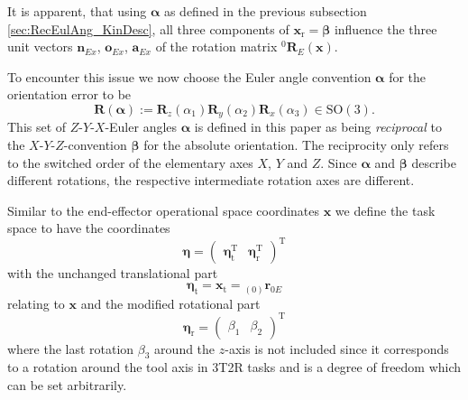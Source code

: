 \documentclass[twocolumn,10pt]{IFTOMM}
\newcommand{\bm}[1]{\boldsymbol{#1}}
\newcommand{\ortvek}[4]{{ }_{(#1)}{\boldsymbol{#2}}^{#3}_{#4} }
\newcommand{\rotmat}[2]{{{ }^{#1}\boldsymbol{R}}_{#2}}
\newcommand{\transp}[0]{{\mathrm{T}}}
\begin{document}
It is apparent, that using $\bm{\alpha}$ as defined in the previous subsection\,\ref{sec:RecEulAng_KinDesc}, all three components of $\bm{x}_{\mathrm{r}}=\bm{\beta}$ influence the three unit vectors $\bm{n}_{Ex}$, $\bm{o}_{Ex}$, $\bm{a}_{Ex}$ of the rotation matrix $\rotmat{0}{E}(\bm{x})$.

To encounter this issue we now choose the Euler angle convention $\bm{\alpha}$ for the orientation error to be 
%
\begin{equation}
\bm{R}(\bm{\alpha}) := \bm{R}_z(\alpha_1) \bm{R}_y(\alpha_2) \bm{R}_x(\alpha_3) \in \mathrm{SO(3)}.
\label{equ:def_rmat_zyxr}
\end{equation}
%
This set of $Z$-$Y$-$X$-Euler angles $\bm{\alpha}$ is defined in this paper as being \emph{reciprocal} to the $X$-$Y$-$Z$-convention $\bm{\beta}$ for the absolute orientation.
%
The reciprocity only refers to the switched order of the elementary axes $X$, $Y$ and $Z$.
Since $\bm{\alpha}$ and $\bm{\beta}$ describe different rotations, the respective intermediate rotation axes are different.

Similar to the end-effector operational space coordinates $\bm{x}$ we define the task space to have the coordinates
%
\begin{equation}
\bm{\eta}
=
\begin{pmatrix}
\bm{\eta}_{\mathrm{t}}^\transp & 
\bm{\eta}_{\mathrm{r}}^\transp
\end{pmatrix}^\transp
\end{equation}  
%
with the unchanged translational part
%
\begin{equation}
\bm{\eta}_{\mathrm{t}}
=
\bm{x}_{\mathrm{t}}
=
\ortvek{0}{r}{}{0E}
\end{equation}  
%
relating to $\bm{x}$ and the modified rotational part
%
\begin{equation}
\bm{\eta}_{\mathrm{r}}
=
\begin{pmatrix}
\beta_1  & \beta_2
\end{pmatrix}^\transp
\label{equ:etar_def}
\end{equation}
%
where the last rotation $\beta_3$ around the $z$-axis is not included since it corresponds to a rotation around the tool axis in 3T2R tasks and is a degree of freedom which can be set arbitrarily.
\end{document}
